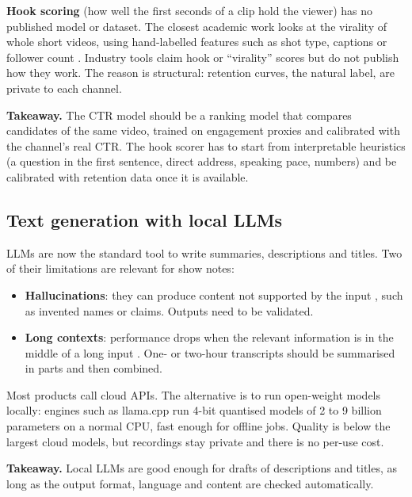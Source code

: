 \documentclass[ENG]{TFUOC}
\begin{document}
\textbf{Hook scoring} (how well the first seconds of a clip hold the viewer) has no published model or dataset. The closest academic work looks at the virality of whole short videos, using hand-labelled features such as shot type, captions or follower count \cite{ling2022tiktok}. Industry tools claim hook or ``virality'' scores but do not publish how they work. The reason is structural: retention curves, the natural label, are private to each channel.

\textbf{Takeaway.} The CTR model should be a ranking model that compares candidates of the same video, trained on engagement proxies and calibrated with the channel's real CTR. The hook scorer has to start from interpretable heuristics (a question in the first sentence, direct address, speaking pace, numbers) and be calibrated with retention data once it is available.

\subsection{Text generation with local LLMs}
\label{ss:soa-llm}

LLMs are now the standard tool to write summaries, descriptions and titles. Two of their limitations are relevant for show notes:
\begin{itemize}
\item \textbf{Hallucinations}: they can produce content not supported by the input \cite{ji2023hallucination}, such as invented names or claims. Outputs need to be validated.
\item \textbf{Long contexts}: performance drops when the relevant information is in the middle of a long input \cite{liu2024lostmiddle}. One- or two-hour transcripts should be summarised in parts and then combined.
\end{itemize}

Most products call cloud APIs. The alternative is to run open-weight models locally: engines such as llama.cpp \cite{llamacpp} run 4-bit quantised models of 2 to 9 billion parameters on a normal CPU, fast enough for offline jobs. Quality is below the largest cloud models, but recordings stay private and there is no per-use cost.

\textbf{Takeaway.} Local LLMs are good enough for drafts of descriptions and titles, as long as the output format, language and content are checked automatically.

\end{document}
